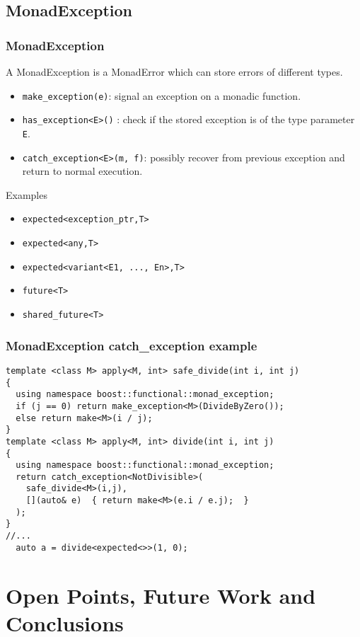 \documentclass[xcolor=dvipsnames]{beamer}
\newcommand{\cpp}[1]{\lstinline{#1}}
\begin{document}
\subsection{MonadException}
\begin{frame}[fragile]
\frametitle{MonadException}

A MonadException is a MonadError which can store errors of different types.

\begin{itemize}
  \item \cpp{make_exception(e)}: signal an exception on a monadic function.
  \item \cpp{has_exception<E>()} : check if the stored exception is of the type parameter \cpp{E}.
  \item \cpp{catch_exception<E>(m, f)}: possibly recover from previous exception and return to normal execution.
\end{itemize}

Examples
\begin{itemize}
  \item \cpp{expected<exception_ptr,T>} 
  \item \cpp{expected<any,T>} 
  \item \cpp{expected<variant<E1, ..., En>,T>} 
  \item \cpp{future<T>} 
  \item \cpp{shared_future<T>} 
\end{itemize}
\end{frame}
\begin{frame}[fragile]
\frametitle{MonadException catch\_exception example}

\begin{lstlisting}
template <class M> apply<M, int> safe_divide(int i, int j)  
{
  using namespace boost::functional::monad_exception;
  if (j == 0) return make_exception<M>(DivideByZero());
  else return make<M>(i / j);
}
template <class M> apply<M, int> divide(int i, int j)  
{
  using namespace boost::functional::monad_exception;
  return catch_exception<NotDivisible>(
    safe_divide<M>(i,j), 
    [](auto& e)  { return make<M>(e.i / e.j);  }
  );
}
//...
  auto a = divide<expected<>>(1, 0);
\end{lstlisting}
\end{frame}

\section{Open Points, Future Work and Conclusions}
\end{document}
